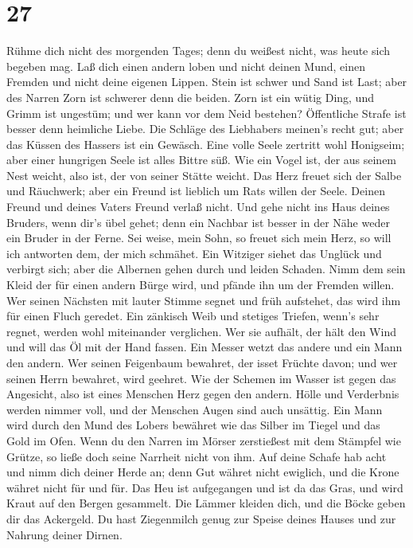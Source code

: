 \hypertarget{section-26}{%
\section{27}\label{section-26}}

 Rühme dich nicht des morgenden Tages; denn du weißest
nicht, was heute sich begeben mag.  Laß dich einen andern
loben und nicht deinen Mund, einen Fremden und nicht deine eigenen
Lippen.  Stein ist schwer und Sand ist Last; aber des Narren
Zorn ist schwerer denn die beiden.  Zorn ist ein wütig Ding,
und Grimm ist ungestüm; und wer kann vor dem Neid bestehen? 
Öffentliche Strafe ist besser denn heimliche Liebe.  Die
Schläge des Liebhabers meinen's recht gut; aber das Küssen des Hassers
ist ein Gewäsch.  Eine volle Seele zertritt wohl Honigseim;
aber einer hungrigen Seele ist alles Bittre süß.  Wie ein
Vogel ist, der aus seinem Nest weicht, also ist, der von seiner Stätte
weicht.  Das Herz freuet sich der Salbe und Räuchwerk; aber
ein Freund ist lieblich um Rats willen der Seele.  Deinen
Freund und deines Vaters Freund verlaß nicht. Und gehe nicht ins Haus
deines Bruders, wenn dir's übel gehet; denn ein Nachbar ist besser in
der Nähe weder ein Bruder in der Ferne.  Sei weise, mein
Sohn, so freuet sich mein Herz, so will ich antworten dem, der mich
schmähet.  Ein Witziger siehet das Unglück und verbirgt
sich; aber die Albernen gehen durch und leiden Schaden. 
Nimm dem sein Kleid der für einen andern Bürge wird, und pfände ihn um
der Fremden willen.  Wer seinen Nächsten mit lauter Stimme
segnet und früh aufstehet, das wird ihm für einen Fluch geredet.
 Ein zänkisch Weib und stetiges Triefen, wenn's sehr
regnet, werden wohl miteinander verglichen.  Wer sie
aufhält, der hält den Wind und will das Öl mit der Hand fassen.
 Ein Messer wetzt das andere und ein Mann den andern.
 Wer seinen Feigenbaum bewahret, der isset Früchte davon;
und wer seinen Herrn bewahret, wird geehret.  Wie der
Schemen im Wasser ist gegen das Angesicht, also ist eines Menschen Herz
gegen den andern.  Hölle und Verderbnis werden nimmer voll,
und der Menschen Augen sind auch unsättig.  Ein Mann wird
durch den Mund des Lobers bewähret wie das Silber im Tiegel und das Gold
im Ofen.  Wenn du den Narren im Mörser zerstießest mit dem
Stämpfel wie Grütze, so ließe doch seine Narrheit nicht von ihm.
 Auf deine Schafe hab acht und nimm dich deiner Herde an;
 denn Gut währet nicht ewiglich, und die Krone währet nicht
für und für.  Das Heu ist aufgegangen und ist da das Gras,
und wird Kraut auf den Bergen gesammelt.  Die Lämmer
kleiden dich, und die Böcke geben dir das Ackergeld.  Du
hast Ziegenmilch genug zur Speise deines Hauses und zur Nahrung deiner
Dirnen.

